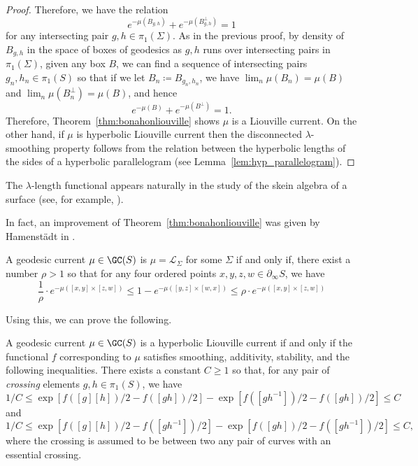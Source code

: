 \begin{proof}
Therefore, we have the relation
\[
e^{-\mu(B_{g,h})} + e^{-\mu(B_{g,h}^{\perp})} =1
\]
for any intersecting pair $g,h \in \pi_1(\Sigma)$.
As in the previous proof, by density of $B_{g,h}$ in the space of boxes of geodesics as $g,h$ runs over intersecting pairs in $\pi_1(\Sigma)$, given any box $B$, we can find a sequence of intersecting pairs $g_n, h_n \in \pi_1(S)$ so that if we let $B_n \coloneqq B_{g_n, h_n}$, we have $\lim_n \mu(B_n) =\mu(B)$ and $\lim_n \mu(B_n^{\perp}) = \mu(B)$, and hence
\[
e^{-\mu(B)} + e^{-\mu(B^{\perp})}=1.
\]
Therefore, Theorem~\ref{thm:bonahonliouville} shows $\mu$ is a Liouville current.
On the other hand, if $\mu$ is hyperbolic Liouville current then the disconnected $\lambda$-smoothing property follows from the relation between the hyperbolic lengths of the sides of a hyperbolic parallelogram (see Lemma~\ref{lem:hyp_parallelogram}).
\end{proof}

\begin{remark}
The $\lambda$-length functional appears naturally in the study of the skein algebra of a surface (see, for example, \cite[3. Skein algebra]{Thurston14:PBI}). 
\end{remark}

In fact, an improvement of Theorem~\ref{thm:bonahonliouville} was given by Hamenst\"adt in \cite[Corollary~2.12]{Ham99:Cocycles}.

\begin{theorem}
   A geodesic current $\mu \in \GC(S)$ is $\mu=\mathcal{L}_{\Sigma}$ for some $\Sigma$ if and only if, there exist a number $\rho>1$ so that for any four ordered points $x,y,z,w \in \partial_{\infty} S$, we have
    \[
      \frac{1}{\rho} \cdot  e^{-\mu([x,y]\times[z,w])} \leq 1- e^{-\mu([y,z]\times [w,x])} \leq \rho \cdot e^{-\mu([x,y]\times[z,w])} 
   \]
   \label{thm:ham}
\end{theorem}

Using this, we can prove the following.

\begin{theorem}
A geodesic current $\mu \in \GC(S)$ is a hyperbolic Liouville current if and only if the functional $f$ corresponding to $\mu$ satisfies smoothing, additivity, stability, and the following inequalities.
    There exists a constant $C \geq 1$ so that, for any pair of \emph{crossing} elements $g,h \in \pi_1(S)$, we have
    \begin{equation}
    1/C \leq \exp \left[ f\left([g][h]\right)/2-f\left([gh]\right)/2 \right] - \exp \left[ f\left([gh^{-1}]\right)/2-f\left([gh]\right)/2 \right] \leq C
    \end{equation}
    and
    \begin{equation}
     1/C \leq  \exp \left[ f\left([g][h]\right)/2-f\left([gh^{-1}]\right)/2 \right] - \exp \left[ f\left([gh]\right)/2-f\left([gh^{-1}]\right)/2 \right] \leq C,
    \end{equation}
    where the crossing is assumed to be between two any pair of curves with an essential crossing.
    \label{thm:char_liouville_strong}
  \end{theorem}

